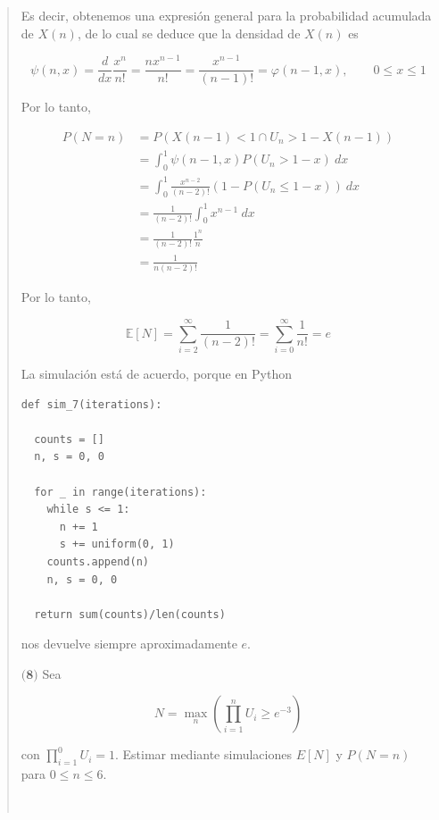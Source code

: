 \documentclass[a4paper, 12pt]{article}
\begin{document}
\begin{quote}
Es decir, obtenemos una expresión general para la probabilidad acumulada de
$X(n)$, de lo cual se deduce que la densidad de $X(n)$ es 

\begin{equation*}
  \psi(n, x) = \frac{d}{dx} \frac{x^n}{n!} = \frac{nx^{n-1}}{n!} =
  \frac{x^{n-1}}{(n-1)!} = \varphi(n-1, x), \qquad 0 \leq x \leq 1
\end{equation*}

Por lo tanto,

\begin{align*}
  P(N = n) 
  &= P(X(n-1) < 1 \cap U_n > 1 -X(n-1)) \\ 
  &=\int_0^1 \psi(n-1, x) P(U_n > 1 - x) ~ dx \\ 
  &=\int_0^1 \frac{x^{n-2}}{(n-2)!}(1 - P(U_n \leq 1-x)) ~ dx \\ 
  &=\frac{1}{(n-2)!}\int_0^1  x^{n-1} ~ dx \\ 
  &=\frac{1}{(n-2)!} \frac{1^n}{n} \\ 
  &= \frac{1}{n(n-2)!}
\end{align*}

Por lo tanto, 

\begin{equation*}
  \mathbb{E}\left[ N \right] = \sum_{i=2}^\infty \frac{1}{(n-2)!} =
  \sum_{i=0}^\infty \frac{1}{n!} = e
\end{equation*}

La simulación está de acuerdo, porque en Python 

\begin{verbatim}
def sim_7(iterations):

  counts = []
  n, s = 0, 0

  for _ in range(iterations):
    while s <= 1:
      n += 1
      s += uniform(0, 1)
    counts.append(n)
    n, s = 0, 0
 
  return sum(counts)/len(counts)
\end{verbatim}

nos devuelve siempre aproximadamente $e$.

\pagebreak 

$\textbf{(8)}$ Sea  

\begin{equation*}
  N = \max_{n} \left( \prod_{i=1}^n U_i \geq e^{-3} \right) 
\end{equation*}

con $\prod_{i=1}^0 U_i = 1$. Estimar mediante simulaciones $E[N]$ y $P(N = n)$
para $0 \leq n \leq 6$.

~


\end{quote}
\end{document}
